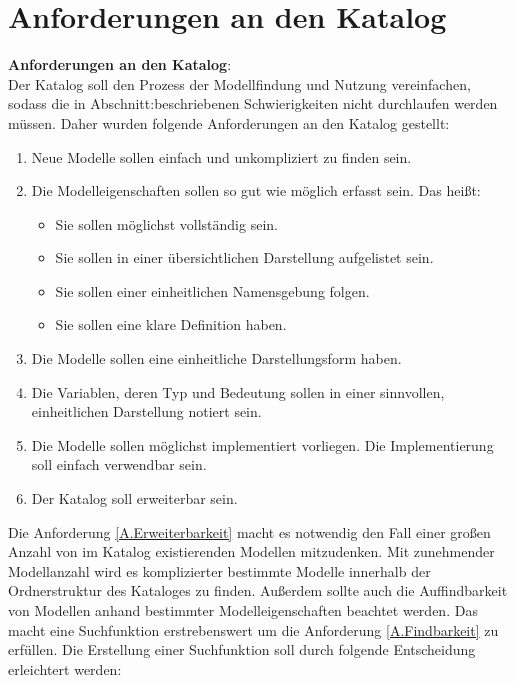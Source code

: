\section{Anforderungen an den Katalog} %
\label{Ch:ErstProz:Sec:Struktur}
\textbf{Anforderungen an den Katalog}:\\ %
Der Katalog soll den Prozess der Modellfindung und Nutzung vereinfachen, sodass die in Abschnitt:\glqq {}\grqq beschriebenen Schwierigkeiten nicht durchlaufen werden müssen. Daher wurden folgende Anforderungen an den Katalog gestellt:
\begin{enumerate}[label=\textbf{Anforderung A.\arabic*}:, ref=\textbf{A.\arabic*}, wide=0pt, leftmargin=*]
	\item \label{A.Findbarkeit}Neue Modelle sollen einfach und unkompliziert zu finden sein.
	\item \label{A.Modelleigenschaften}Die Modelleigenschaften sollen so gut wie möglich erfasst sein. Das heißt:
	\begin{itemize}[label=$\bullet$]
		\item Sie sollen möglichst vollständig sein.
		\item Sie sollen in einer übersichtlichen Darstellung aufgelistet sein.
		\item Sie sollen einer einheitlichen Namensgebung folgen.
		\item Sie sollen eine klare Definition haben.
	\end{itemize}
	\item \label{A.Darstellung_Gleichungen}Die Modelle sollen eine einheitliche Darstellungsform haben.
	\item \label{A.Darstellung_Variablen}Die Variablen, deren Typ und Bedeutung sollen in einer sinnvollen, einheitlichen Darstellung notiert sein.
	\item \label{A.Implementierung}Die Modelle sollen möglichst implementiert vorliegen. Die Implementierung soll einfach verwendbar sein.
	\item \label{A.Erweiterbarkeit}Der Katalog soll erweiterbar sein. %
\end{enumerate}
Die Anforderung \ref{A.Erweiterbarkeit} macht es notwendig den Fall einer großen Anzahl von im Katalog existierenden Modellen mitzudenken. Mit zunehmender Modellanzahl wird es komplizierter bestimmte Modelle innerhalb der Ordnerstruktur des Kataloges zu finden. Außerdem sollte auch die Auffindbarkeit von Modellen anhand bestimmter Modelleigenschaften beachtet werden. Das macht eine Suchfunktion erstrebenswert um die Anforderung \ref{A.Findbarkeit} zu erfüllen. Die Erstellung einer Suchfunktion soll durch folgende Entscheidung erleichtert werden:
